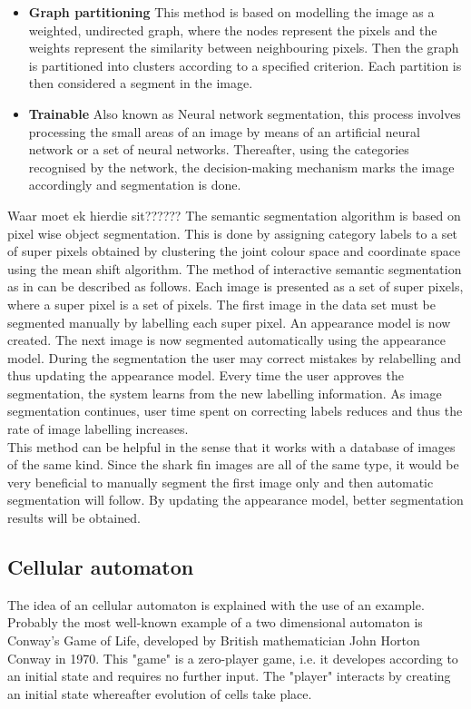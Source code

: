 \documentclass[a4paper,10pt]{article}
\begin{document}
\begin{itemize}
 \item \textbf{Graph partitioning}\cite{rw} This method is based on modelling
the image as a weighted, undirected graph, where the nodes represent the pixels
and the weights represent the similarity between neighbouring pixels. Then the
graph is partitioned into clusters according to a specified criterion.  Each
partition is then considered a segment in the image.
 \item \textbf{Trainable}\cite{trainable} Also known as Neural network segmentation,
this process involves processing the small areas of an image by means of an
artificial neural network or a set of neural networks.  Thereafter, using the
categories recognised by the network, the decision-making mechanism marks the
image accordingly and segmentation is done.
\end{itemize}

Waar moet ek hierdie sit??????
The semantic segmentation
algorithm is based on pixel wise object segmentation.  This is done by 
assigning category labels to a set of super pixels obtained by clustering the
joint colour space and coordinate space using the mean shift algorithm.
The method of interactive semantic segmentation as in \cite{RF} can be described
as follows.  Each image is presented as a set of super pixels, where 
a super pixel is a set of pixels.  The first image in the data set must be
segmented manually by labelling each super pixel. An appearance model is 
now created.  The next image is now segmented automatically using the appearance
model.  During the segmentation the user may correct mistakes by 
relabelling and thus updating the appearance model.  Every time the user
approves the segmentation, the system learns from the new labelling information.
As image segmentation continues, user time spent on correcting labels reduces
and thus the rate of image labelling increases. \\

This method can be helpful in the sense that it works with a database of images
of the same kind.  Since the shark fin images are all of the same type, 
it would be very beneficial to manually segment the first image only and then
automatic segmentation will follow.  By updating the appearance model, 
better segmentation results will be obtained.  \\ 

\subsection{Cellular automaton}
\label{ca}
The idea of an cellular automaton is explained with the use of an example.
Probably the most well-known example of a two dimensional automaton is Conway's
Game of Life\cite{gol}, developed by British mathematician John Horton Conway in 1970. 
This "game" is a zero-player game, i.e. it developes according to an initial
state
and requires no further input.  The "player" interacts by creating an initial
state whereafter evolution of cells take place.  \\
\end{document}
